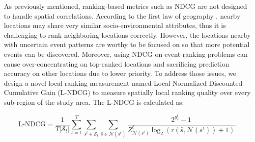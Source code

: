 \documentclass{article}
\def \S {\mathbf{S}}
\def \S {\mathcal{S}}
\def \N {\mathcal{N}}
\begin{document}

As previously mentioned, ranking-based metrics such as NDCG are not designed to handle spatial correlations. According to the first law of geography \cite{ToblerW.R.1970ACMS}, nearby locations may share very similar socio-environmental attributes, thus it is challenging to rank neighboring locations correctly. However, the locations nearby with uncertain event patterns are worthy to be focused on so that more potential events can be discovered. Moreover, using NDCG on event ranking problems can cause over-concentrating on top-ranked locations and sacrificing prediction accuracy on other locations due to lower priority. To address those issues, we design a novel local ranking measurement named Local Normalized Discounted Cumulative Gain (L-NDCG) to measure spatially local ranking quality over every sub-region of the study area. The L-NDCG is calculated as:

\begin{equation} \label{eqn:LNDCG}
\text{L-NDCG}=\frac{1}{T{|\S_t|}}\sum_{t=1}^T\sum_{s^t\in \S_t} \sum_{\hat{s}\in \N(s^t)} \frac{2^{y^t_{\hat{s}}}-1}{Z^t_{\N(s^t)}\log_2(r(\hat{s},\N(s^t))+1)}.
\end{equation}
\end{document}

